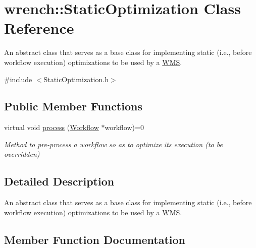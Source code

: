 \hypertarget{classwrench_1_1_static_optimization}{}\section{wrench\+:\+:Static\+Optimization Class Reference}
\label{classwrench_1_1_static_optimization}


An abstract class that serves as a base class for implementing static (i.\+e., before workflow execution) optimizations to be used by a \hyperlink{classwrench_1_1_w_m_s}{W\+MS}.  




{\ttfamily \#include $<$Static\+Optimization.\+h$>$}

\subsection*{Public Member Functions}
\begin{DoxyCompactItemize}
\item 
virtual void \hyperlink{classwrench_1_1_static_optimization_aa3912fb98c9681c72069f7878e8dd790}{process} (\hyperlink{classwrench_1_1_workflow}{Workflow} $\ast$workflow)=0
\begin{DoxyCompactList}\small\item\em Method to pre-\/process a workflow so as to optimize its execution (to be overridden) \end{DoxyCompactList}\end{DoxyCompactItemize}


\subsection{Detailed Description}
An abstract class that serves as a base class for implementing static (i.\+e., before workflow execution) optimizations to be used by a \hyperlink{classwrench_1_1_w_m_s}{W\+MS}. 

\subsection{Member Function Documentation}
\mbox{\label{classwrench_1_1_static_optimization_aa3912fb98c9681c72069f7878e8dd790}} 
